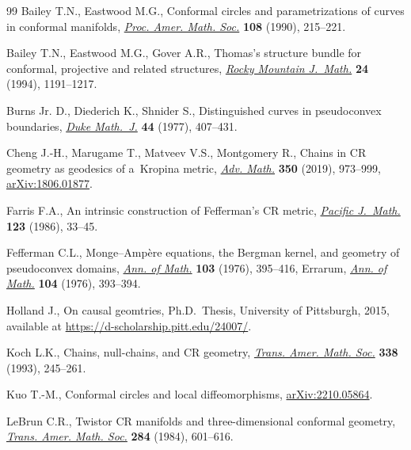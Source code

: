 \documentclass[11pt]{article}
\numberwithin{equation}{section}
\numberwithin{equation}{section}
\begin{document}
\begin{thebibliography}{99}
Bailey T.N., Eastwood M.G., Conformal circles and parametrizations of curves in
 conformal manifolds, \href{https://doi.org/10.2307/2047716}{\textit{Proc.
 Amer. Math. Soc.}} \textbf{108} (1990), 215--221.

Bailey T.N., Eastwood M.G., Gover A.R., Thomas's structure bundle for
 conformal, projective and related structures,
 \href{https://doi.org/10.1216/rmjm/1181072333}{\textit{Rocky Mountain
 J.~Math.}} \textbf{24} (1994), 1191--1217.

Burns Jr. D., Diederich K., Shnider S., Distinguished curves in pseudoconvex
 boundaries, \href{https://doi.org/10.1215/S0012-7094-77-04419-2}{\textit{Duke
 Math.~J.}} \textbf{44} (1977), 407--431.

Cheng J.-H., Marugame T., Matveev V.S., Montgomery R., Chains in {CR} geometry
 as geodesics of a~{K}ropina metric,
 \href{https://doi.org/10.1016/j.aim.2019.05.004}{\textit{Adv. Math.}}
 \textbf{350} (2019), 973--999,
 \href{http://arxiv.org/abs/1806.01877}{arXiv:1806.01877}.

Farris F.A., An intrinsic construction of {F}efferman's {CR} metric,
 \href{https://doi.org/10.2140/pjm.1986.123.33}{\textit{Pacific J.~Math.}}
 \textbf{123} (1986), 33--45.

Fefferman C.L., Monge--{A}mp\`ere equations, the {B}ergman kernel, and geometry
 of pseudoconvex domains, \href{https://doi.org/10.2307/1970945}{\textit{Ann.
 of Math.}} \textbf{103} (1976), 395--416, {E}rrarum,
 \href{https://doi.org/10.2307/1970961}{\textit{Ann. of Math.}} \textbf{104}
 (1976), 393--394.

Holland J., On causal geomtries, Ph.D.~Thesis, {U}niversity of Pittsburgh,
 2015, available at \url{https://d-scholarship.pitt.edu/24007/}.

Koch L.K., Chains, null-chains, and {CR} geometry,
 \href{https://doi.org/10.2307/2154455}{\textit{Trans. Amer. Math. Soc.}}
 \textbf{338} (1993), 245--261.

Kuo T.-M., Conformal circles and local diffeomorphisms,
 \href{http://arxiv.org/abs/2210.05864}{arXiv:2210.05864}.

LeBrun C.R., Twistor {CR} manifolds and three-dimensional conformal geometry,
 \href{https://doi.org/10.2307/1999098}{\textit{Trans. Amer. Math. Soc.}}
 \textbf{284} (1984), 601--616.


\end{thebibliography}
\end{document}
